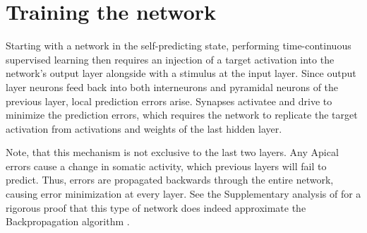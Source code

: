 \section{Training the network}

Starting with a network in the self-predicting state, performing time-continuous supervised learning then requires an
injection of a target activation into the network's output layer alongside with a stimulus at the input layer. Since
output layer neurons feed back into both interneurons and pyramidal neurons of the previous layer, local prediction
errors arise. Synapses activatee and drive to minimize the prediction errors, which requires the network to replicate
the target activation from activations and weights of the last hidden layer.

Note, that this mechanism is not exclusive to the last two layers. Any Apical errors cause a change in somatic activity,
which previous layers will fail to predict. Thus, errors are propagated backwards through the entire network, causing
error minimization at every layer. See the Supplementary analysis of \cite{sacramento2018dendritic} for a rigorous proof
that this type of network does indeed approximate the Backpropagation algorithm .



